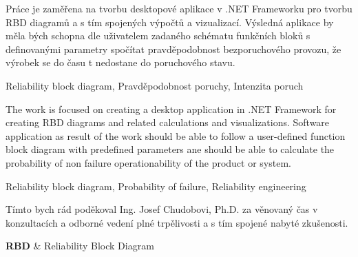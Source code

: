 \documentclass[FM,RP]{tulthesis}
\begin{document}
% 

\begin{abstractCZ}
    Práce je zaměřena na tvorbu desktopové aplikace v .NET Frameworku pro tvorbu RBD diagramů a s tím spojených výpočtů a vizualizací.
    Výsledná aplikace by měla bých schopna dle uživatelem zadaného schématu funkčních bloků s definovanými parametry 
    spočítat pravděpodobnost bezporuchového provozu, že výrobek se do času t nedostane do poruchového stavu.
\end{abstractCZ}

\begin{keywordsCZ}
    Reliability block diagram, Pravděpodobnost poruchy, Intenzita poruch
\end{keywordsCZ}

\begin{abstractEN}
    The work is focused on creating a desktop application in .NET Framework for creating RBD diagrams and related calculations and visualizations.
    Software application as result of the work should be able to follow a user-defined function block diagram with predefined parameters ane should be able
    to calculate the probability of non failure operationability of the product or system.
\end{abstractEN}

\begin{keywordsEN}
    Reliability block diagram, Probability of failure, Reliability engineering
\end{keywordsEN}

\vspace{2cm}



\clearpage

\begin{acknowledgement}
    Tímto bych rád poděkoval Ing. Josef Chudobovi, Ph.D. za věnovaný čas v konzultacích a odborné vedení plné trpělivosti a s tím spojené nabyté zkušenosti.
\end{acknowledgement}

\tableofcontents
\listoffigures

\clearpage

\begin{abbrList}
    \textbf{RBD} & Reliability Block Diagram \\
   
\end{abbrList}
\end{document}
